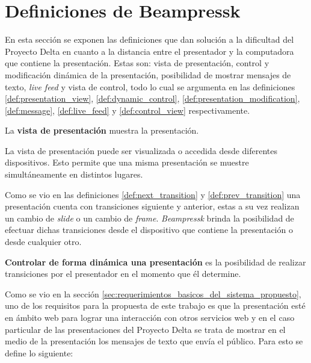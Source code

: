 	\section{Definiciones de Beampressk} %
	\label{sec:definiciones_de_beampressk}

		 En esta sección se exponen las definiciones que dan solución a la dificultad del Proyecto Delta en cuanto a la distancia entre el presentador y la computadora que contiene la presentación. Estas son: vista de presentación, control y modificación dinámica de la presentación, posibilidad de mostrar mensajes de texto, \textit{live feed} y vista de control, todo lo cual se argumenta en las definiciones \ref{def:presentation_view}, \ref{def:dynamic_control}, \ref{def:presentation_modification}, \ref{def:message}, \ref{def:live_feed} y \ref{def:control_view} respectivamente. %

		\begin{definition}
		\label{def:presentation_view}
			La \textbf{vista de presentación} muestra la presentación. 
		\end{definition}

		La vista de presentación puede ser visualizada o accedida desde diferentes dispositivos. Esto permite que una misma presentación se muestre simultáneamente en distintos lugares.

		Como se vio en las definiciones \ref{def:next_transition} y \ref{def:prev_transition} una presentación cuenta con transiciones siguiente y anterior, estas a su vez realizan un cambio de \textit{slide} o un cambio de \textit{frame}. \textit{Beampressk} brinda la posibilidad de efectuar dichas transiciones desde el dispositivo que contiene la presentación o desde cualquier otro.


		\begin{definition}
		\label{def:dynamic_control}
			\textbf{Controlar de forma dinámica una presentación} es la posibilidad de realizar transiciones por el presentador en el momento que él determine.
		\end{definition}



		Como se vio en la sección \ref{sec:requerimientos_basicos_del_sistema_propuesto}, uno de los requisitos para la propuesta de este trabajo es que la presentación esté en ámbito web para lograr una interacción con otros servicios web y en el caso particular de las presentaciones del Proyecto Delta se trata de mostrar en el medio de la presentación los mensajes de texto que envía el público. Para esto se define lo siguiente: 


